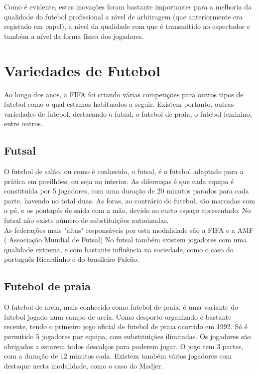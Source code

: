 \documentclass[a4paper,12pt]{report}
\begin{document}
Como é evidente, estas inovações foram bastante importantes para a melhoria da qualidade do futebol profissional a nível de arbitragem (que anteriormente era registado em papel), a nível da qualidade com que é transmitido ao espectador e também a nível da forma física dos jogadores. 

\chapter{Variedades de Futebol}
\label{Variedades de Futebol}
Ao longo dos anos, a FIFA foi criando várias competições para outros tipos de futebol como o qual estamos habituados a seguir. Existem portanto, outras variedades de futebol, destacando o futsal, o futebol de praia, o futebol feminino, entre outros. 

\section{Futsal}
\label{Futsal}
O futebol de salão, ou como é conhecido, o futsal, é o futebol adaptado para a prática em pavilhões, ou seja no interior. As diferenças é que cada equipa é constituída por 5 jogadores, com uma duração de 20 minutos parados para cada parte, havendo no total duas. As foras, ao contrário do futebol, são marcadas com o pé, e os pontapés de saída com a mão, devido ao curto espaço apresentado. No futsal não existe número de substituições autorizadas.\\
As federações mais "altas" responsáveis por esta modalidade são a FIFA e a AMF ( Associação Mundial de Futsal)
No futsal também existem jogadores com uma qualidade extrema, e com bastante influência na sociedade, como o caso do português Ricardinho e do brasileiro Falcão.

\section{Futebol de praia}
\label{Futebol de praia}
O futebol de areia, mais conhecido como futebol de praia, é uma variante do futebol jogado num campo de areia.
Como desporto organizado é bastante recente, tendo o primeiro jogo oficial de futebol de praia ocorrido em 1992. 
Só é permitido 5 jogadores por equipa, com substituições ilimitadas. Os jogadores são obrigados a estarem todos descalços para poderem jogar. O jogo tem 3 partes, com a duração de 12 minutos cada.
Existem também vários jogadores com destaque nesta modalidade, como o caso do Madjer. \\
\end{document}
